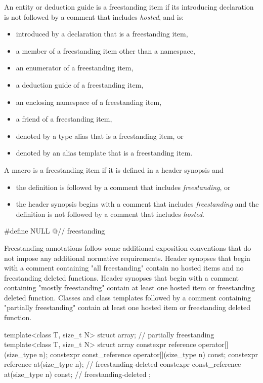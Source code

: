 \pnum
{}%
%
An entity or deduction guide
is a freestanding item if its introducing declaration is not followed by
a comment that includes \textit{hosted}, and is:
\begin{itemize}
\item introduced by a declaration that is a freestanding item,
\item a member of a freestanding item other than a namespace,
\item an enumerator of a freestanding item,
\item a deduction guide of a freestanding item,
\item an enclosing namespace of a freestanding item,
\item a friend of a freestanding item,
\item denoted by a type alias that is a freestanding item, or
\item denoted by an alias template that is a freestanding item.
\end{itemize}

\pnum
{}%
A macro is a freestanding item if it is defined in a header synopsis and
\begin{itemize}
\item the definition is followed by a comment
that includes \textit{freestanding}, or
\item the header synopsis begins with a comment
that includes \textit{freestanding} and
the definition is not followed by a comment that includes \textit{hosted}.
\end{itemize}
\begin{example}
\begin{codeblock}
#define NULL @\seebelow@      // freestanding
\end{codeblock}
\end{example}

\pnum
\begin{note}
Freestanding annotations follow some additional exposition conventions
that do not impose any additional normative requirements.
Header synopses that begin with a comment containing "all freestanding"
contain no hosted items and no freestanding deleted functions.
Header synopses that begin with a comment containing "mostly freestanding"
contain at least one hosted item or freestanding deleted function.
Classes and class templates followed by a comment
containing "partially freestanding"
contain at least one hosted item or freestanding deleted function.
\end{note}
\begin{example}
\begin{codeblock}
template<class T, size_t N> struct array;               // partially freestanding
template<class T, size_t N>
struct array {
  constexpr reference       operator[](size_type n);
  constexpr const_reference operator[](size_type n) const;
  constexpr reference       at(size_type n);            // freestanding-deleted
  constexpr const_reference at(size_type n) const;      // freestanding-deleted
};
\end{codeblock}
\end{example}

